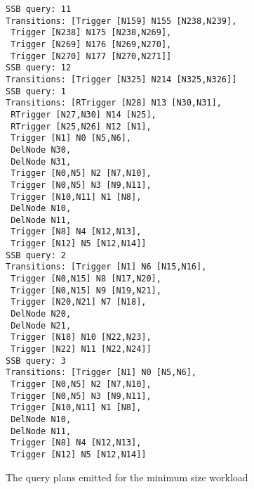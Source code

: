 \begin{code}
\begin{verbatim}
SSB query: 11
Transitions: [Trigger [N159] N155 [N238,N239],
 Trigger [N238] N175 [N238,N269],
 Trigger [N269] N176 [N269,N270],
 Trigger [N270] N177 [N270,N271]]
SSB query: 12
Transitions: [Trigger [N325] N214 [N325,N326]]
SSB query: 1
Transitions: [RTrigger [N28] N13 [N30,N31],
 RTrigger [N27,N30] N14 [N25],
 RTrigger [N25,N26] N12 [N1],
 Trigger [N1] N0 [N5,N6],
 DelNode N30,
 DelNode N31,
 Trigger [N0,N5] N2 [N7,N10],
 Trigger [N0,N5] N3 [N9,N11],
 Trigger [N10,N11] N1 [N8],
 DelNode N10,
 DelNode N11,
 Trigger [N8] N4 [N12,N13],
 Trigger [N12] N5 [N12,N14]]
SSB query: 2
Transitions: [Trigger [N1] N6 [N15,N16],
 Trigger [N0,N15] N8 [N17,N20],
 Trigger [N0,N15] N9 [N19,N21],
 Trigger [N20,N21] N7 [N18],
 DelNode N20,
 DelNode N21,
 Trigger [N18] N10 [N22,N23],
 Trigger [N22] N11 [N22,N24]]
SSB query: 3
Transitions: [Trigger [N1] N0 [N5,N6],
 Trigger [N0,N5] N2 [N7,N10],
 Trigger [N0,N5] N3 [N9,N11],
 Trigger [N10,N11] N1 [N8],
 DelNode N10,
 DelNode N11,
 Trigger [N8] N4 [N12,N13],
 Trigger [N12] N5 [N12,N14]]
\end{verbatim}
\caption{\label{fig:workload_plans}
  The query plans emitted for the minimum size workload}
\end{code}

